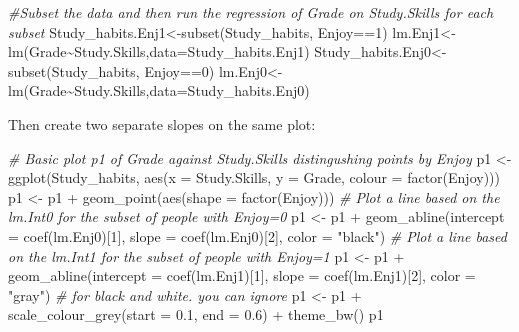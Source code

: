 \documentclass[
]{gitbook}
\newenvironment{Shaded}{\begin{snugshade}}{\end{snugshade}}
\newcommand{\AttributeTok}[1]{\textcolor[rgb]{0.77,0.63,0.00}{#1}}
\newcommand{\CommentTok}[1]{\textcolor[rgb]{0.56,0.35,0.01}{\textit{#1}}}
\newcommand{\DecValTok}[1]{\textcolor[rgb]{0.00,0.00,0.81}{#1}}
\newcommand{\FloatTok}[1]{\textcolor[rgb]{0.00,0.00,0.81}{#1}}
\newcommand{\FunctionTok}[1]{\textcolor[rgb]{0.00,0.00,0.00}{#1}}
\newcommand{\NormalTok}[1]{#1}
\newcommand{\OtherTok}[1]{\textcolor[rgb]{0.56,0.35,0.01}{#1}}
\newcommand{\SpecialCharTok}[1]{\textcolor[rgb]{0.00,0.00,0.00}{#1}}
\newcommand{\StringTok}[1]{\textcolor[rgb]{0.31,0.60,0.02}{#1}}
\begin{document}
\begin{Shaded}
\begin{Highlighting}[]
\CommentTok{\#Subset the data and then run the regression of Grade on Study.Skills for each subset}
\NormalTok{Study\_habits.Enj1}\OtherTok{\textless{}{-}}\FunctionTok{subset}\NormalTok{(Study\_habits, Enjoy}\SpecialCharTok{==}\DecValTok{1}\NormalTok{)}
\NormalTok{lm.Enj1}\OtherTok{\textless{}{-}}\FunctionTok{lm}\NormalTok{(Grade}\SpecialCharTok{\textasciitilde{}}\NormalTok{Study.Skills,}\AttributeTok{data=}\NormalTok{Study\_habits.Enj1)}
\NormalTok{Study\_habits.Enj0}\OtherTok{\textless{}{-}}\FunctionTok{subset}\NormalTok{(Study\_habits, Enjoy}\SpecialCharTok{==}\DecValTok{0}\NormalTok{)}
\NormalTok{lm.Enj0}\OtherTok{\textless{}{-}}\FunctionTok{lm}\NormalTok{(Grade}\SpecialCharTok{\textasciitilde{}}\NormalTok{Study.Skills,}\AttributeTok{data=}\NormalTok{Study\_habits.Enj0)}
\end{Highlighting}
\end{Shaded}

Then create two separate slopes on the same plot:

\begin{Shaded}
\begin{Highlighting}[]
\CommentTok{\# Basic plot p1 of Grade against Study.Skills distingushing points by Enjoy}
\NormalTok{p1 }\OtherTok{\textless{}{-}} \FunctionTok{ggplot}\NormalTok{(Study\_habits, }\FunctionTok{aes}\NormalTok{(}\AttributeTok{x =}\NormalTok{ Study.Skills, }\AttributeTok{y =}\NormalTok{ Grade, }\AttributeTok{colour =} \FunctionTok{factor}\NormalTok{(Enjoy)))}
\NormalTok{p1 }\OtherTok{\textless{}{-}}\NormalTok{ p1 }\SpecialCharTok{+} \FunctionTok{geom\_point}\NormalTok{(}\FunctionTok{aes}\NormalTok{(}\AttributeTok{shape =} \FunctionTok{factor}\NormalTok{(Enjoy)))}
\CommentTok{\# Plot a line based on the lm.Int0 for the subset of people with Enjoy=0}
\NormalTok{p1 }\OtherTok{\textless{}{-}}\NormalTok{ p1 }\SpecialCharTok{+} \FunctionTok{geom\_abline}\NormalTok{(}\AttributeTok{intercept =} \FunctionTok{coef}\NormalTok{(lm.Enj0)[}\DecValTok{1}\NormalTok{], }\AttributeTok{slope =} \FunctionTok{coef}\NormalTok{(lm.Enj0)[}\DecValTok{2}\NormalTok{], }\AttributeTok{color =} \StringTok{"black"}\NormalTok{)}
\CommentTok{\# Plot a line based on the lm.Int1 for the subset of people with Enjoy=1}
\NormalTok{p1 }\OtherTok{\textless{}{-}}\NormalTok{ p1 }\SpecialCharTok{+} \FunctionTok{geom\_abline}\NormalTok{(}\AttributeTok{intercept =} \FunctionTok{coef}\NormalTok{(lm.Enj1)[}\DecValTok{1}\NormalTok{], }\AttributeTok{slope =} \FunctionTok{coef}\NormalTok{(lm.Enj1)[}\DecValTok{2}\NormalTok{], }\AttributeTok{color =} \StringTok{"gray"}\NormalTok{)}
\CommentTok{\# for black and white. you can ignore}
\NormalTok{p1 }\OtherTok{\textless{}{-}}\NormalTok{ p1 }\SpecialCharTok{+} \FunctionTok{scale\_colour\_grey}\NormalTok{(}\AttributeTok{start =} \FloatTok{0.1}\NormalTok{, }\AttributeTok{end =} \FloatTok{0.6}\NormalTok{) }\SpecialCharTok{+} \FunctionTok{theme\_bw}\NormalTok{()}
\NormalTok{p1}
\end{Highlighting}
\end{Shaded}
\end{document}
